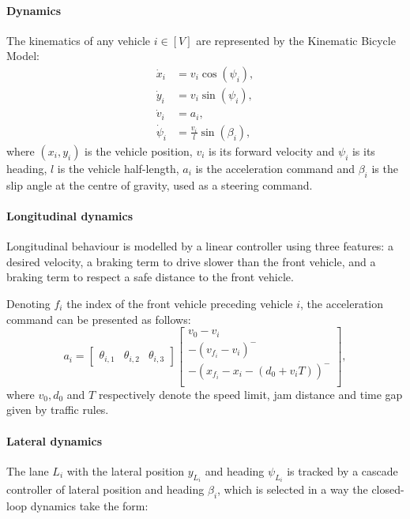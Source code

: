 \documentclass{article}
\begin{document}
\paragraph{Dynamics}

The kinematics of any vehicle $i\in[V]$ are represented by the Kinematic Bicycle Model:
\begin{align}
\dot{x}_i &= v_i\cos(\psi_i), \nonumber\\
\dot{y}_i &= v_i\sin(\psi_i), \nonumber\\
\dot{v}_i &= a_i, \nonumber\\
\dot{\psi}_i &= \frac{v_i}{l}\sin(\beta_i), \nonumber
\end{align}
where $(x_i, y_i)$ is the vehicle position, $v_i$ is its forward velocity and $\psi_i$ is its heading, $l$ is the vehicle half-length, $a_i$ is the acceleration command and $\beta_i$ is the slip angle at the centre of gravity, used as a steering command.

\paragraph{Longitudinal dynamics}
Longitudinal behaviour is modelled by a linear controller using three features: a desired velocity, a braking term to drive slower than the front vehicle, and a braking term to respect a safe distance to the front vehicle.

Denoting $f_i$ the index of the front vehicle preceding vehicle $i$, the acceleration command can be presented as follows:
\begin{equation*}
a_i = \begin{bmatrix}
\theta_{i,1} & \theta_{i,2} & \theta_{i,3}
\end{bmatrix} \begin{bmatrix}
v_0 - v_i \\
-(v_{f_i}-v_i)^- \\
-(x_{f_i} - x_i - (d_0 + v_iT))^- \\
\end{bmatrix},
\label{eq:theta_a}
\end{equation*}
where $v_0, d_0$ and $T$ respectively denote the speed limit, jam distance and time gap given by traffic rules.

\paragraph{Lateral dynamics}

The lane $L_i$ with the lateral position $y_{L_i}$ and heading $\psi_{L_i}$ is tracked by a cascade controller of lateral position and heading $\beta_i$, which is selected in a way the closed-loop dynamics take the form:
\end{document}
